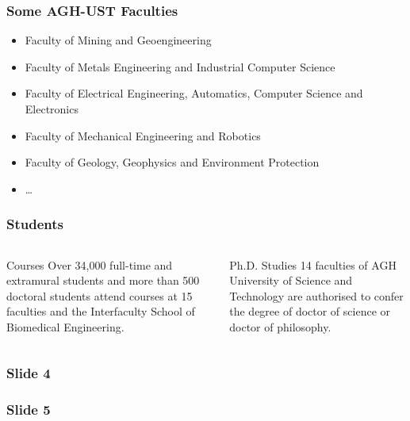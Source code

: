 \documentclass{beamer}
\begin{document}
\begin{frame}
\frametitle{Some AGH-UST Faculties}

\begin{itemize}
\item Faculty of Mining and Geoengineering
\item Faculty of Metals Engineering and Industrial Computer Science
\item Faculty of Electrical Engineering, Automatics, Computer Science and Electronics
\item Faculty of Mechanical Engineering and Robotics
\item Faculty of Geology, Geophysics and Environment Protection
\item \dots
\end{itemize}

\end{frame}



\begin{frame}
\frametitle{Students}

\begin{columns}
\begin{block}{Courses}
Over 34,000 full-time and extramural students and more than 500 doctoral students attend courses at 15 faculties and the Interfaculty School of Biomedical Engineering.
\end{block}
\begin{block}{Ph.D. Studies}
14 faculties of AGH University of Science and Technology are authorised to confer the degree of doctor of science or doctor of philosophy.
\end{block}
\end{columns}

\end{frame}


\begin{frame}
\frametitle{Slide 4}



\end{frame}


\begin{frame}
\frametitle{Slide 5}



\end{frame}

\end{document}
